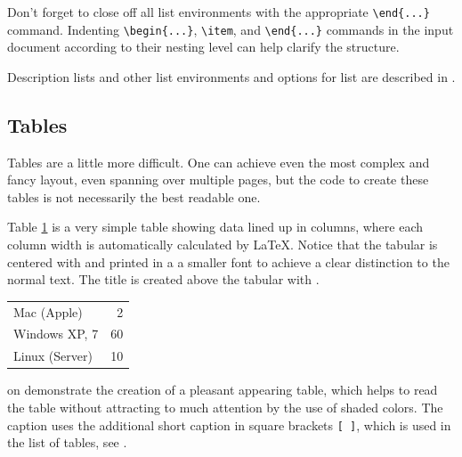 Don't forget to close off all list environments with the 
appropriate \verb+\end{...}+ command.
Indenting \verb+\begin{...}+, \verb+\item+, and \verb+\end{...}+
commands in the input document according to their nesting level can help 
clarify the structure.

Description lists and other list environments and options for list are described in .

\subsection{Tables}
\label{sec:example:tables}

Tables are a little more difficult. One can achieve even the most complex and fancy layout, even spanning over multiple pages, but the code to create these tables is not necessarily the best readable one.

Table \ref{tab:Computers} is a very simple table showing data lined up in columns, where each column width is automatically calculated by LaTeX.
Notice that the tabular is centered with  and printed in a a smaller font to achieve a clear distinction to the normal text. The title is created above the tabular with .

\begin{table}[hb]
\centering
\small\renewcommand{\arraystretch}{1.4}  
\label{tab:Computers}
\begin{tabular}{lr}
\hline
Mac (Apple)    & 2  \\
Windows XP, 7  & 60 \\
Linux (Server) & 10 \\
\hline
\end{tabular}
\end{table}

 on  demonstrate the creation of a pleasant appearing table, which helps to read the table without attracting to much attention by the use of shaded colors. The caption uses the additional short caption in square brackets \texttt{[ ]}, which is used in the list of tables, see .

